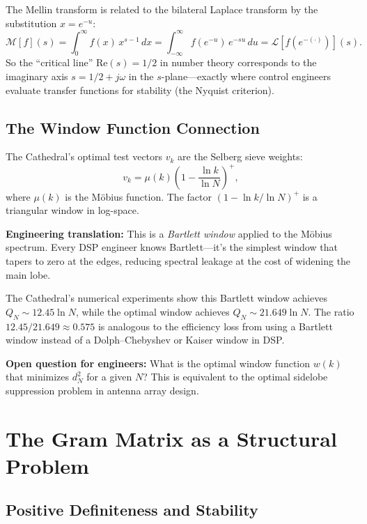 \documentclass[11pt,a4paper]{article}
\begin{document}
The Mellin transform is related to the bilateral Laplace transform
by the substitution $x = e^{-u}$:
\[
  \mathcal{M}[f](s) = \int_0^\infty f(x)\,x^{s-1}\,dx
  = \int_{-\infty}^{\infty} f(e^{-u})\,e^{-su}\,du
  = \mathcal{L}[f(e^{-(\cdot)})](s).
\]
So the ``critical line'' $\mathrm{Re}(s) = 1/2$ in number theory
corresponds to the imaginary axis $s = 1/2 + j\omega$ in the
$s$-plane---exactly where control engineers evaluate transfer
functions for stability (the Nyquist criterion).

\subsection{The Window Function Connection}

The Cathedral's optimal test vectors $v_k$ are the Selberg sieve
weights:
\[
  v_k = \mu(k)\left(1 - \frac{\ln k}{\ln N}\right)^+,
\]
where $\mu(k)$ is the M\"obius function. The factor
$(1 - \ln k / \ln N)^+$ is a triangular window in log-space.

\textbf{Engineering translation:} This is a \emph{Bartlett window}
applied to the M\"obius spectrum. Every DSP engineer knows
Bartlett---it's the simplest window that tapers to zero at the
edges, reducing spectral leakage at the cost of widening the main
lobe.

The Cathedral's numerical experiments show this Bartlett window
achieves $Q_N \sim 12.45 \ln N$, while the optimal window achieves
$Q_N \sim 21.649 \ln N$. The ratio $12.45 / 21.649 \approx 0.575$
is analogous to the efficiency loss from using a Bartlett window
instead of a Dolph--Chebyshev or Kaiser window in DSP.

\textbf{Open question for engineers:} What is the optimal window
function $w(k)$ that minimizes $d_N^2$ for a given $N$? This is
equivalent to the optimal sidelobe suppression problem in antenna
array design.

\section{The Gram Matrix as a Structural Problem}
\label{sec:structural}

\subsection{Positive Definiteness and Stability}
\end{document}
